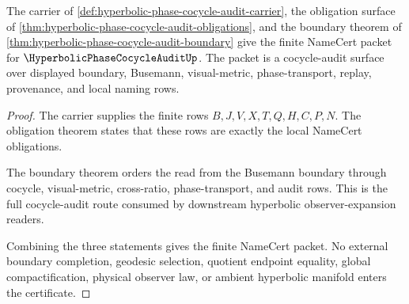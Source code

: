 \begin{theorem}
\label{thm:hyperbolic-phase-cocycle-audit-namecert}
The carrier of \autoref{def:hyperbolic-phase-cocycle-audit-carrier}, the obligation surface of \autoref{thm:hyperbolic-phase-cocycle-audit-obligations}, and the boundary theorem of \autoref{thm:hyperbolic-phase-cocycle-audit-boundary} give the finite NameCert packet for $\HyperbolicPhaseCocycleAuditUp$. The packet is a cocycle-audit surface over displayed boundary, Busemann, visual-metric, phase-transport, replay, provenance, and local naming rows.
\end{theorem}
\begin{proof}
The carrier supplies the finite rows $B,J,V,X,T,Q,H,C,P,N$. The obligation theorem states that these rows are exactly the local NameCert obligations.

The boundary theorem orders the read from the Busemann boundary through cocycle, visual-metric, cross-ratio, phase-transport, and audit rows. This is the full cocycle-audit route consumed by downstream hyperbolic observer-expansion readers.

Combining the three statements gives the finite NameCert packet. No external boundary completion, geodesic selection, quotient endpoint equality, global compactification, physical observer law, or ambient hyperbolic manifold enters the certificate.
\end{proof}




